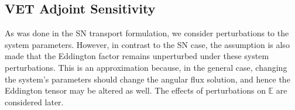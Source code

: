 \documentclass[12pt]{report}
\newcommand{\Edd}{\mathbb{E}}
\begin{document}
\subsection{VET Adjoint Sensitivity}

As was done in the SN transport formulation, we consider perturbations to the system parameters. However, in contrast to the SN case, the assumption is also made that the Eddington factor remains unperturbed under these system perturbations. This is an approximation because, in the general case, changing the system's parameters should change the angular flux solution, and hence
the Eddington tensor may be altered as well. The effects of perturbations on $\Edd$ are considered later.
\end{document}
